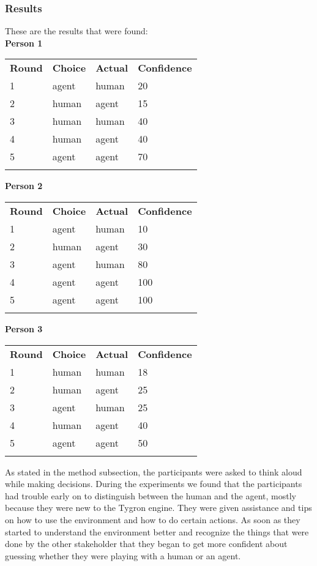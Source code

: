 \subsubsection{Results}
These are the results that were found: \\

\textbf{Person 1}
\begin{tabular}{llll}
\textbf{Round} & \textbf{Choice}  &\textbf{Actual}  & \textbf{Confidence}\\ 
1 & agent & human & 20         \\
2 & human & agent & 15         \\
3 & human & human & 40         \\
4 & human & agent &  40         \\
5 & agent &  agent & 70        \\\\
\end{tabular}

\textbf{Person 2}
\begin{tabular}{llll}
\textbf{Round} & \textbf{Choice}  &\textbf{Actual}   & \textbf{Confidence}\\ 
1 & agent  & human & 10        \\
2 & human  & agent & 30         \\
3 & agent  & human & 80         \\
4 & agent  & agent & 100         \\
5 & agent  & agent & 100       \\\\
\end{tabular}

\textbf{Person 3}
\begin{tabular}{llll}
\textbf{Round} & \textbf{Choice}  &\textbf{Actual}   & \textbf{Confidence}\\ 
1 & human  & human & 18         \\
2 & human  & agent &  25         \\
3 & agent  & human & 25         \\
4 & human  & agent &  40         \\
5 & agent  & agent & 50        \\\\
\end{tabular}

As stated in the method subsection, the participants were asked to think aloud while making decisions. During the experiments we found that the participants had trouble early on to distinguish between the human and the agent, mostly because they were new to the Tygron engine. They were given assistance and tips on how to use the environment and how to do certain actions. As soon as they started to understand the environment better and recognize the things that were done by the other stakeholder that they began to get more confident about guessing whether they were playing with a human or an agent.

